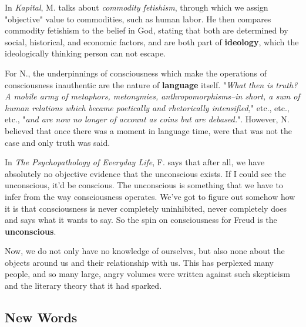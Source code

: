 \documentclass[]{scrartcl}
\begin{document}
\begin{description}[leftmargin=!,labelwidth=\widthof{\bfseries Nietzsche}]
  \item[Marx] In \emph{Kapital}, M. talks about \emph{commodity fetishism}, through which we assign "objective" value to commodities, such as human labor. He then compares commodity fetishism to the belief in God, stating that both are determined by social, historical, and economic factors, and are both part of \textbf{ideology}, which the ideologically thinking person can not escape.
  \item[Nietzsche] For N., the underpinnings of consciousness which make the operations of consciousness inauthentic are the nature of \textbf{language} itself. "\emph{What then is truth? A mobile army of metaphors, metonymies, anthropomorphisms--in short, a sum of human relations which became poetically and rhetorically intensified,}" etc., etc., etc., "\emph{and are now no longer of account as coins but are debased.}". However, N. believed that once there was a moment in language time, were that was not the case and only truth was said.
  \item[Freud] In \emph{The Psychopathology of Everyday Life}, F. says that after all, we have absolutely no objective evidence that the unconscious exists. If I could see the unconscious, it'd be conscious. The unconscious is something that we have to infer from the way consciousness operates. We've got to figure out somehow how it is that consciousness is never completely uninhibited, never completely does and says what it wants to say. So the spin on consciousness for Freud is the \textbf{unconscious}.
  
\end{description}

Now, we do not only have no knowledge of ourselves, but also none about the objects around us and their relationship with us. This has perplexed many people, and so many large, angry volumes were written against such skepticism and the literary theory that it had sparked.

\subsection{New Words}
\end{document}

